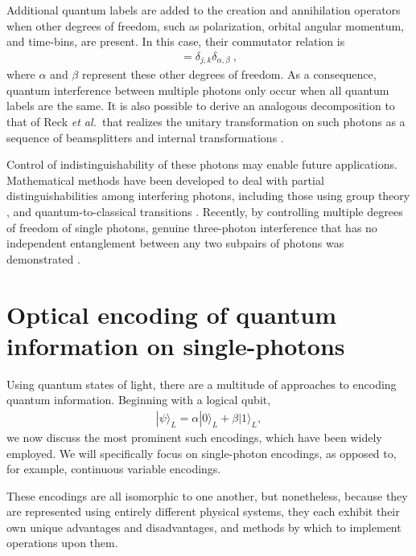 \documentclass[times,final]{elsarticle}
\newcommand{\ket}[1]{|#1\rangle}
\newcommand{\ah}{\hat{a}}
\newcommand{\adagh}{\hat{a}^\dag}
\begin{document}
Additional quantum labels are added to the creation and annihilation operators when other degrees of freedom, such as polarization, orbital angular momentum, and time-bins, are present. In this case, their commutator relation is
\begin{align}
[\ah_{j,\alpha},\adagh_{k,\beta}]=\delta_{j,k}\delta_{\alpha,\beta}\ ,
\end{align}
where $\alpha$ and $\beta$ represent these other degrees of freedom. As a consequence, quantum interference between multiple photons only occur when all quantum labels are the same. It is also possible to derive an analogous decomposition to that of Reck {\it et al.~}that realizes the unitary transformation on such photons as a sequence of beamsplitters and internal transformations \cite{bib:Dhand2015}.

Control of indistinguishability of these photons may enable future applications. Mathematical methods have been developed to deal with partial distinguishabilities among interfering photons, including those using group theory \cite{bib:Tan2013,bib:deGuise2014,bib:Shchesnovich15,bib:deGuise2015}, and quantum-to-classical transitions \cite{bib:Ra2013}. Recently, by controlling multiple degrees of freedom of single photons, genuine three-photon interference that has no independent entanglement between any two subpairs of photons was demonstrated  \cite{bib:Agne17,bib:Menssen17}.

\section{Optical encoding of quantum information on single-photons}\label{sec:encoding}

Using quantum states of light, there are a multitude of approaches to encoding quantum information. Beginning with a logical qubit,
\begin{align}
\ket\psi_L = \alpha \ket{0}_L + \beta\ket{1}_L,
\end{align}
we now discuss the most prominent such encodings, which have been widely employed. We will specifically focus on single-photon encodings, as opposed to, for example, continuous variable encodings.

These encodings are all isomorphic to one another, but nonetheless, because they are represented using entirely different physical systems, they each exhibit their own unique advantages and disadvantages, and methods by which to implement operations upon them.

\end{document}
